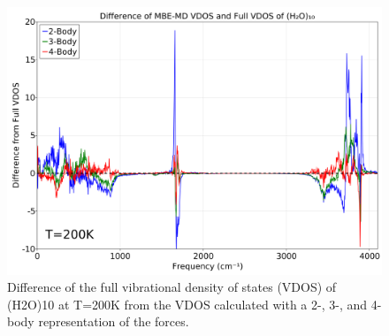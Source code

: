 \begin{figure}[t]
\uwsinglespace
\begin{center}
\begin{minipage}{0.9\textwidth}
\includegraphics[width=\textwidth]{Figures/Chapter_4/ch4_figure_5.png}
\end{minipage}
\end{center}
\begin{spacing}{1.0}
\caption[Difference of the full vibrational density of states (VDOS) of (H2O)10 at T=200K from the VDOS calculated with a 2-, 3-, and 4-body representation of the forces.]{Difference of the full vibrational density of states (VDOS) of (H2O)10 at T=200K from the VDOS calculated with a 2-, 3-, and 4-body representation of the forces.}\label{fig:MBE_MD_F5}
\end{spacing}
\end{figure}